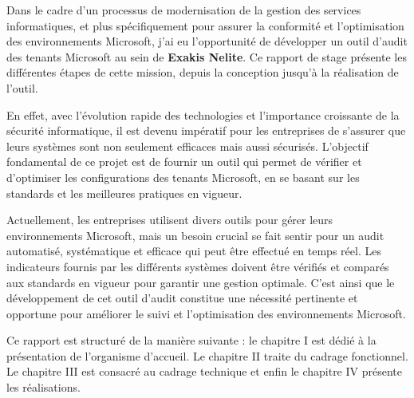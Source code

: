 Dans le cadre d’un processus de modernisation de la gestion des services informatiques, et plus spécifiquement pour assurer la conformité et l’optimisation des environnements Microsoft, j’ai eu l’opportunité de développer un outil d’audit des tenants Microsoft au sein de \textbf{Exakis Nelite}. Ce rapport de stage présente les différentes étapes de cette mission, depuis la conception jusqu’à la réalisation de l’outil.

En effet, avec l'évolution rapide des technologies et l'importance croissante de la sécurité informatique, il est devenu impératif pour les entreprises de s'assurer que leurs systèmes sont non seulement efficaces mais aussi sécurisés. L’objectif fondamental de ce projet est de fournir un outil qui permet de vérifier et d’optimiser les configurations des tenants Microsoft, en se basant sur les standards et les meilleures pratiques en vigueur.

Actuellement, les entreprises utilisent divers outils pour gérer leurs environnements Microsoft, mais un besoin crucial se fait sentir pour un audit automatisé, systématique et efficace qui peut être effectué en temps réel. Les indicateurs fournis par les différents systèmes doivent être vérifiés et comparés aux standards en vigueur pour garantir une gestion optimale. C’est ainsi que le développement de cet outil d’audit constitue une nécessité pertinente et opportune pour améliorer le suivi et l’optimisation des environnements Microsoft.

Ce rapport est structuré de la manière suivante : le chapitre I est dédié à la présentation de l’organisme d’accueil. Le chapitre II traite du cadrage fonctionnel. Le chapitre III est consacré au cadrage technique et enfin le chapitre IV présente les réalisations.